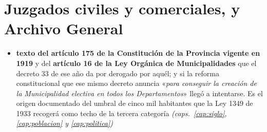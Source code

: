 \section{Juzgados civiles y comerciales, y Archivo General}

\begin{itemize}[leftmargin=*]
\item \textbf{texto del artículo 175 de la Constitución de la Provincia vigente en 1919} y del \textbf{artículo 16 de la Ley Orgánica de Municipalidades} que el decreto 33 de ese año da por derogado por aquél; y si la reforma constitucional que ese mismo decreto anuncia «\textit{para conseguir la creación de la Municipalidad electiva en todos los Departamentos}» llegó a intentarse. Es el origen documentado del umbral de cinco mil habitantes que la Ley 1349 de 1933 recogerá como techo de la tercera categoría \textit{(caps.\ \ref{cap:siglo}, \ref{cap:poblacion} y \ref{cap:politica})}


\end{itemize}
